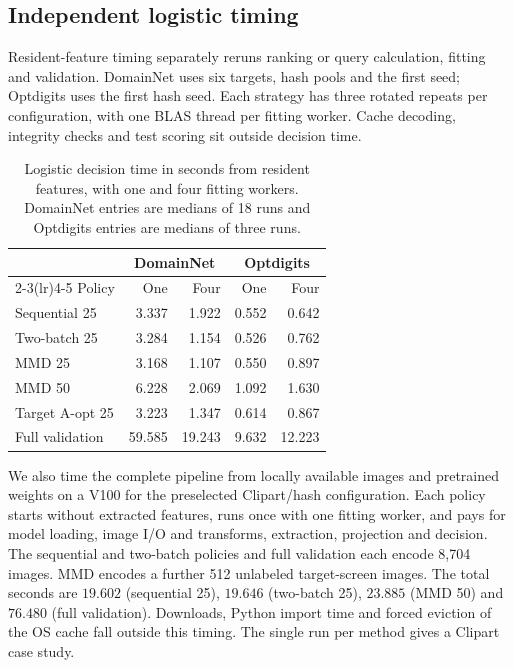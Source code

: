 \subsection{Independent logistic timing}
\label{app:fresh-timing}
Resident-feature timing separately reruns ranking or query calculation, fitting and validation. DomainNet uses six targets, hash pools and the first seed; Optdigits uses the first hash seed. Each strategy has three rotated repeats per configuration, with one BLAS thread per fitting worker. Cache decoding, integrity checks and test scoring sit outside decision time.

\begin{table}[!htb]
\centering
\caption{Logistic decision time in seconds from resident features, with one and four fitting workers. DomainNet entries are medians of 18 runs and Optdigits entries are medians of three runs.}
\label{tab:fresh-logistic-time}
\begin{tabular}{lrrrr}
\toprule
 & \multicolumn{2}{c}{DomainNet} & \multicolumn{2}{c}{Optdigits} \\
\cmidrule(lr){2-3}\cmidrule(lr){4-5}
Policy & One & Four & One & Four \\
\midrule
Sequential 25 & 3.337 & 1.922 & 0.552 & 0.642 \\
Two-batch 25 & 3.284 & 1.154 & 0.526 & 0.762 \\
MMD 25 & 3.168 & 1.107 & 0.550 & 0.897 \\
MMD 50 & 6.228 & 2.069 & 1.092 & 1.630 \\
Target A-opt 25 & 3.223 & 1.347 & 0.614 & 0.867 \\
Full validation & 59.585 & 19.243 & 9.632 & 12.223 \\
\bottomrule
\end{tabular}
\end{table}

We also time the complete pipeline from locally available images and pretrained weights on a V100 for the preselected Clipart/hash configuration. Each policy starts without extracted features, runs once with one fitting worker, and pays for model loading, image I/O and transforms, extraction, projection and decision. The sequential and two-batch policies and full validation each encode 8,704 images. MMD encodes a further 512 unlabeled target-screen images. The total seconds are $19.602$ (sequential 25), $19.646$ (two-batch 25), $23.885$ (MMD 50) and $76.480$ (full validation). Downloads, Python import time and forced eviction of the OS cache fall outside this timing. The single run per method gives a Clipart case study.

